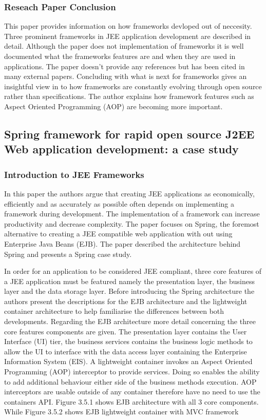 										\subsubsection{Reseach Paper Conclusion}
										This paper provides information on how frameworks devloped out of neccesity. Three prominent frameworks in JEE application development are described in detail. Although the paper does not implementation of frameworks it is well documented what the frameworks features are and when they are used in applications. The paper doesn't provide any references but has been cited in many external papers. Concluding with what is next for frameworks gives an insightful view in to how frameworks are constantly evolving through open source rather than specifications. The author explains how framework features such as Aspect Oriented Programming (AOP) are becoming more important.
										
										\subsection{Spring framework for rapid open source J2EE Web application development: a case study}
										
										\subsubsection{Introduction to JEE Frameworks}
										In this paper the authors argue that creating JEE applications as economically, efficiently and as accurately as possible often depends on implementing a framework during development. The implementation of a framework can increase productivity and decrease complexity\cite{experteoneonone}. The paper focuses on Spring, the foremost alternative to creating a JEE compatible web application with out using Enterprise Java Beans (EJB). The paper described the architecture behind Spring and presents a Spring case study.
										
										In order for an application to be considered JEE compliant, three core features of a JEE application must be featured namely the presentation layer, the business layer and the data storage layer. Before introducing the Spring architecture the authors present the descriptions for the EJB architecture and the lightweight container architecture to help familiarise the differences between both developments. Regarding the EJB architecture more detail concerning the three core features components are given. The presentation layer contains the User Interface (UI) tier, the business services contains the business logic methods to allow the UI to interface with the data access layer containing the Enterprise Information System (EIS). A lightweight container invokes an Aspect Oriented Programming (AOP) interceptor to provide services. Doing so enables the ability to add additional behaviour either side of the business methods execution. AOP interceptors are usable outside of any container therefore have no need to use the containers API. Figure 3.5.1 shows EJB architecture with all 3 core components. While Figure 3.5.2 shows EJB lightweight container with MVC framework
										
